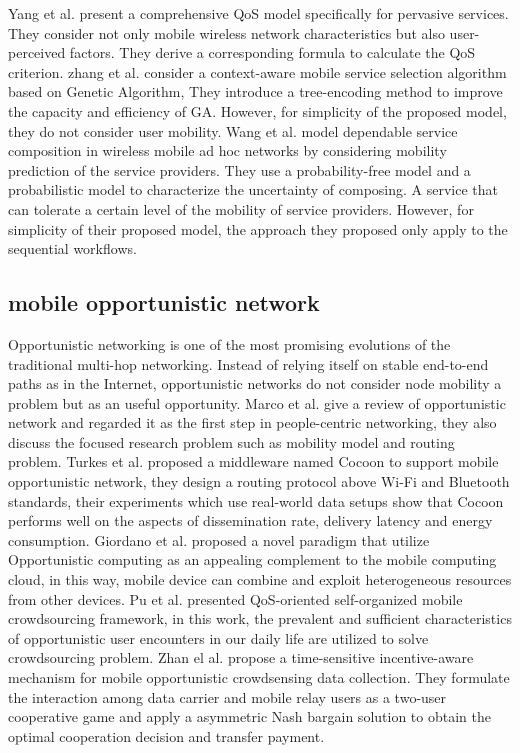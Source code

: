 \documentclass[journal]{IEEEtran}
\begin{document}
Yang et al. \cite{Yang2010} present a comprehensive QoS model specifically for pervasive services. They consider not only mobile wireless network characteristics but also user-perceived factors. They derive a corresponding formula to calculate the QoS criterion.
zhang et al. \cite{Zhang2016qos} consider a context-aware mobile service selection algorithm based on Genetic Algorithm, They introduce a tree-encoding method to improve the capacity and efficiency of GA. However, for simplicity of the proposed model, they do not consider user mobility.
Wang et al. \cite{wang2011exploiting} model dependable service composition in wireless mobile ad hoc networks by considering mobility prediction of the service providers.
They use a probability-free model and a probabilistic model to characterize the uncertainty of composing. A service that can tolerate a certain level of the mobility of service providers. However, for simplicity of their proposed model, the approach they proposed only apply to the sequential workflows.

\subsection{mobile opportunistic network}
Opportunistic networking is one of the most promising evolutions of the traditional multi-hop networking. 
Instead of relying itself on stable end-to-end paths as in the Internet, opportunistic networks do not consider node mobility a problem but as an useful opportunity. 
Marco et al. \cite{Conti2014} give a review of opportunistic network and regarded it as the first step in people-centric networking, they also discuss the focused research problem such as mobility model and routing problem.
Turkes et al. \cite{turkes2016cocoon} proposed a middleware named Cocoon to support mobile opportunistic network, they design a routing protocol above Wi-Fi and Bluetooth standards, their experiments which use real-world data setups show that Cocoon performs well on the aspects of dissemination rate, delivery latency and energy consumption.
Giordano et al. \cite{giordano2011human} proposed a novel paradigm that utilize Opportunistic computing as an appealing complement to the mobile computing cloud, in this way, mobile device can combine and exploit heterogeneous resources from other devices.
Pu et al. \cite{Pu2017crowd} presented QoS-oriented self-organized mobile crowdsourcing framework, in this work, the prevalent and sufficient characteristics of opportunistic user encounters in our daily life are utilized to solve crowdsourcing problem.
Zhan el al. \cite{zhan2017time} propose a time-sensitive incentive-aware mechanism for mobile opportunistic crowdsensing data collection. They formulate the interaction among data carrier and mobile relay users as a two-user cooperative game and apply a asymmetric Nash bargain solution to obtain the optimal cooperation decision and transfer payment.
\end{document}
